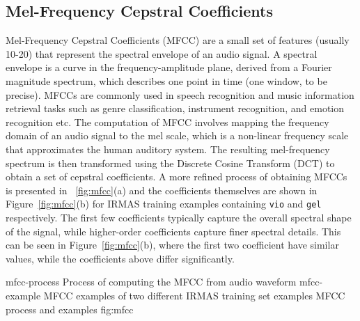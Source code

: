 \subsection{Mel-Frequency Cepstral Coefficients}
\label{sec:mfcc}
Mel-Frequency Cepstral Coefficients (MFCC) are a small set of features (usually 10-20) that represent the spectral envelope of an audio signal. A spectral envelope is a curve in the frequency-amplitude plane, derived from a Fourier magnitude spectrum, which describes one point in time (one window, to be precise). MFCCs are commonly used in speech recognition and music information retrieval tasks such as genre classification, instrument recognition, and emotion recognition etc. The computation of MFCC involves mapping the frequency domain of an audio signal to the mel scale, which is a non-linear frequency scale that approximates the human auditory system. The resulting mel-frequency spectrum is then transformed using the Discrete Cosine Transform (DCT) to obtain a set of cepstral coefficients. A more refined process of obtaining MFCCs is presented in ~\ref{fig:mfcc}(a) and the coefficients themselves are shown in Figure~\ref{fig:mfcc}(b) for IRMAS training examples containing \texttt{vio} and \texttt{gel} respectively. The first few coefficients typically capture the overall spectral shape of the signal, while higher-order coefficients capture finer spectral details. This can be seen in Figure~\ref{fig:mfcc}(b), where the first two coefficient have similar values, while the coefficients above differ significantly. 

\asideimages{15cm}{15cm}
	    {mfcc-process}
	    {Process of computing the MFCC from audio waveform}
	    {mfcc-example}
	    {MFCC examples of two different IRMAS training set examples}
	    {MFCC process and examples}
	    {fig:mfcc}

